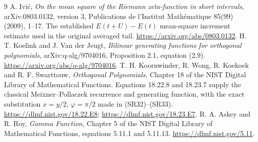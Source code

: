 \documentclass[11pt]{article}
\begin{document}
\begin{thebibliography}{9}
 A. Ivi\'c, \emph{On the mean square of the Riemann zeta-function
in short intervals}, arXiv:0803.0132, version 3, Publications de l'Institut
Math\'ematique 85(99) (2009), 1--17. The established $E(t+U)-E(t)$
mean-square increment estimate used in the original averaged tail.
\url{https://arxiv.org/abs/0803.0132}.
 H. T. Koelink and J. Van der Jeugt,
\emph{Bilinear generating functions for orthogonal polynomials},
arXiv:q-alg/9704016, Proposition 2.1, equation (2.9).
\url{https://arxiv.org/abs/q-alg/9704016}.
 T. H. Koornwinder, R. Wong, R. Koekoek and R. F. Swarttouw,
\emph{Orthogonal Polynomials}, Chapter 18 of the NIST Digital Library of
Mathematical Functions. Equations 18.22.8 and 18.23.7 supply the classical
Meixner--Pollaczek recurrence and generating function, with the exact
substitution $x=y/2$, $\varphi=\pi/2$ made in (SR32)--(SR33).
\url{https://dlmf.nist.gov/18.22.E8};
\url{https://dlmf.nist.gov/18.23.E7}.
 R. A. Askey and R. Roy, \emph{Gamma Function}, Chapter 5
of the NIST Digital Library of Mathematical Functions, equations 5.11.1 and
5.11.13. \url{https://dlmf.nist.gov/5.11}.
\end{thebibliography}
\end{document}
